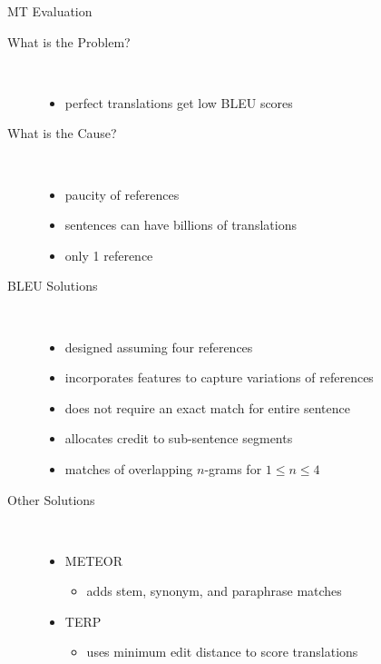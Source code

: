 \begin{block}{MT Evaluation}
\begin{description}
\item[What is the Problem?] \hfill \\
\begin{itemize}
\item 
perfect  translations  get  low BLEU scores
\end{itemize}
\item[What is the Cause? ] \hfill \\
\begin{itemize}
\item 
paucity of references
\item 
sentences  can have billions of  translations 
\item 
only 1 reference
\end{itemize}
\item[BLEU Solutions] \hfill \\
\begin{itemize}
\item 
designed assuming      four references
\item 
incorporates features to capture variations of references
\item 
does not require an exact match for  entire sentence 
\item 
allocates credit to sub-sentence segments
\item 
matches  of overlapping $n$-grams for   $1 \leq n \leq 4$
\end{itemize}
\item[Other Solutions] \hfill \\
\begin{itemize}
\item  
METEOR
\begin{itemize}
\item 
adds stem, synonym, and paraphrase matches
\end{itemize}
\item 
TERP
\begin{itemize}
\item 
uses minimum edit distance to score translations

\end{itemize}
\end{itemize}
\end{description}
\end{block}
